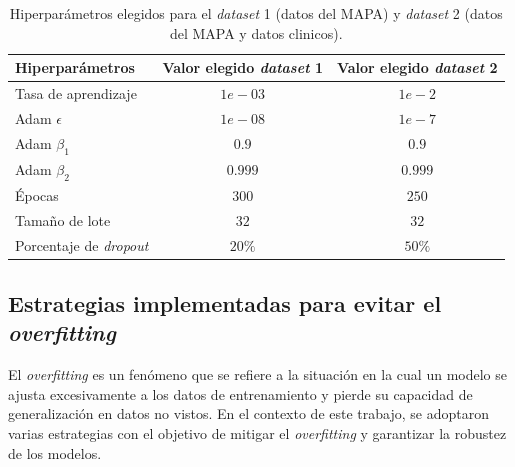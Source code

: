 \begin{table}[H]
	\centering
	\caption{Hiperparámetros elegidos para el \emph{dataset} 1 (datos del MAPA) y \emph{dataset} 2 (datos del MAPA y datos clinicos).}
	\begin{tabular}{l c c}    
		\toprule
		\textbf{Hiperparámetros} 	      & \textbf{Valor elegido \emph{dataset} 1} 	& \textbf{Valor elegido \emph{dataset} 2}  \\
		\midrule
    Tasa de aprendizaje            & $1e-03$                   & $1e-2$\\		
    Adam $\epsilon$                   & $1e-08$                 & $1e-7$\\	
    Adam $\beta_1$                   & $0.9$                 & $0.9$\\	
    Adam $\beta_2$                   & $0.999$                 & $0.999$\\		
    Épocas                  & $300$                 & $250$\\	
    Tamaño de lote                  & $32$                 & $32$\\		
    Porcentaje de \emph{dropout}                 & $20\%$                 & $50\%$\\	

		\bottomrule
		\hline
	\end{tabular}
	\label{tab:Tabla1}
\end{table}


\subsection{Estrategias implementadas para evitar el \emph{overfitting}}
El \emph{overfitting} es un fenómeno que se refiere a la situación en la cual un modelo 
se ajusta excesivamente a los datos de entrenamiento y pierde su capacidad de generalización 
en datos no vistos. En el contexto de este trabajo, se adoptaron varias estrategias 
con el objetivo de mitigar el \emph{overfitting} y garantizar la robustez de los modelos.

